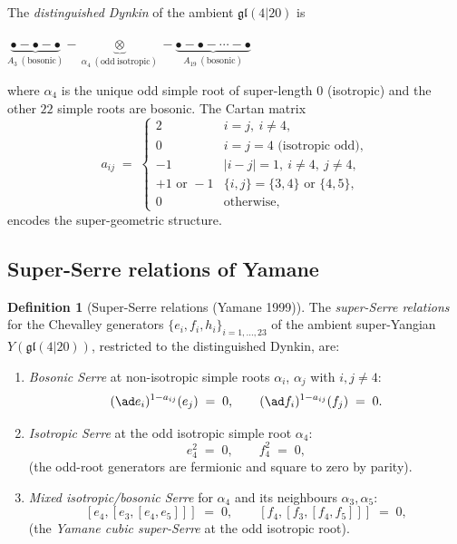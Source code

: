 \documentclass{article}
\providecommand{\fgl}{\mathfrak{gl}}
\theoremstyle{definition}
\newtheorem{definition}[theorem]{Definition}
\begin{document}
The \emph{distinguished Dynkin} of the ambient $\fgl(4|20)$ is
\begin{center}
  $\underbrace{\bullet - \bullet - \bullet}_{A_3\ (\mathrm{bosonic})} - \underbrace{\otimes}_{\alpha_4\ (\mathrm{odd\ isotropic})} - \underbrace{\bullet - \bullet - \cdots - \bullet}_{A_{19}\ (\mathrm{bosonic})}$
\end{center}
where $\alpha_4$ is the unique odd simple root of super-length $0$
(isotropic) and the other $22$ simple roots are bosonic. The Cartan
matrix
\begin{equation}\label{eq:r10-Cartan-matrix}
  a_{ij}
  \;=\;
  \begin{cases}
    2 & i = j,\ i \neq 4, \\
    0 & i = j = 4 \text{ (isotropic odd)}, \\
    -1 & |i - j| = 1,\ i \neq 4,\ j \neq 4, \\
    +1 \text{ or } -1 & \{i, j\} = \{3, 4\} \text{ or } \{4, 5\}, \\
    0 & \text{otherwise},
  \end{cases}
\end{equation}
encodes the super-geometric structure.

\subsection{Super-Serre relations of Yamane}

\begin{definition}[Super-Serre relations (Yamane 1999)]
\label{def:r10-super-Serre}
The \emph{super-Serre relations} for the Chevalley generators
$\{e_i, f_i, h_i\}_{i = 1, \ldots, 23}$ of the ambient super-Yangian
$Y(\fgl(4|20))$, restricted to the distinguished Dynkin, are:
\begin{enumerate}[label=\textup{(S\arabic*)}]
\item \emph{Bosonic Serre} at non-isotropic simple roots
  $\alpha_i$, $\alpha_j$ with $i, j \neq 4$:
\begin{equation}\label{eq:r10-bosonic-Serre}
  (\ad e_i)^{1 - a_{ij}}(e_j) \;=\; 0,
  \qquad
  (\ad f_i)^{1 - a_{ij}}(f_j) \;=\; 0.
\end{equation}
\item \emph{Isotropic Serre} at the odd isotropic simple root
  $\alpha_4$:
\begin{equation}\label{eq:r10-isotropic-Serre}
  e_4^2 \;=\; 0,
  \qquad
  f_4^2 \;=\; 0,
\end{equation}
(the odd-root generators are fermionic and square to zero by parity).
\item \emph{Mixed isotropic/bosonic Serre} for $\alpha_4$ and its
  neighbours $\alpha_3, \alpha_5$:
\begin{equation}\label{eq:r10-mixed-Serre}
  [e_4, [e_3, [e_4, e_5]]] \;=\; 0,
  \qquad
  [f_4, [f_3, [f_4, f_5]]] \;=\; 0,
\end{equation}
(the \emph{Yamane cubic super-Serre} at the odd isotropic root).
\end{enumerate}
\end{definition}
\end{document}
